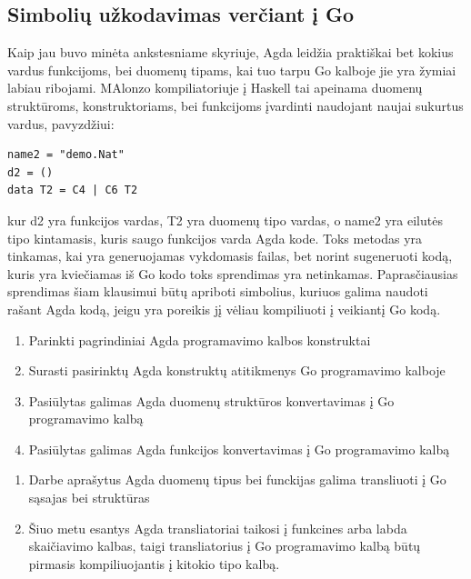 \documentclass{VUMIFPSkursinis}
\begin{document}
\subsection{Simbolių užkodavimas verčiant į Go}
Kaip jau buvo minėta ankstesniame skyriuje, Agda leidžia praktiškai bet kokius vardus funkcijoms, bei duomenų tipams, kai tuo tarpu Go kalboje jie yra žymiai labiau ribojami. MAlonzo kompiliatoriuje į Haskell tai apeinama duomenų struktūroms, konstruktoriams, bei funkcijoms įvardinti naudojant naujai sukurtus vardus, pavyzdžiui:
\begin{lstlisting}
name2 = "demo.Nat"
d2 = ()
data T2 = C4 | C6 T2
\end{lstlisting}
kur d2 yra funkcijos vardas, T2 yra duomenų tipo vardas, o name2 yra eilutės tipo kintamasis, kuris saugo funkcijos varda Agda kode. Toks metodas yra tinkamas, kai yra generuojamas vykdomasis failas, bet norint sugeneruoti kodą, kuris yra kviečiamas iš Go kodo toks sprendimas yra netinkamas. Paprasčiausias sprendimas šiam klausimui būtų apriboti simbolius, kuriuos galima naudoti rašant Agda kodą, jeigu yra poreikis jį vėliau kompiliuoti į veikiantį Go kodą. 
\begin{enumerate}[noitemsep]
  \item Parinkti pagrindiniai Agda programavimo kalbos konstruktai
  \item Surasti pasirinktų Agda konstruktų atitikmenys Go programavimo kalboje
  \item Pasiūlytas galimas Agda duomenų struktūros konvertavimas į Go programavimo kalbą
  \item Pasiūlytas galimas Agda funkcijos konvertavimas į Go programavimo kalbą
\end{enumerate}
\begin{enumerate}[noitemsep]
  \item Darbe aprašytus Agda duomenų tipus bei funckijas galima transliuoti į Go sąsajas bei struktūras
  \item Šiuo metu esantys Agda transliatoriai taikosi į funkcines arba labda skaičiavimo kalbas, taigi transliatorius į Go programavimo kalbą būtų pirmasis kompiliuojantis į kitokio tipo kalbą.
\end{enumerate}

\printbibliography[heading=bibintoc] 
\end{document}
